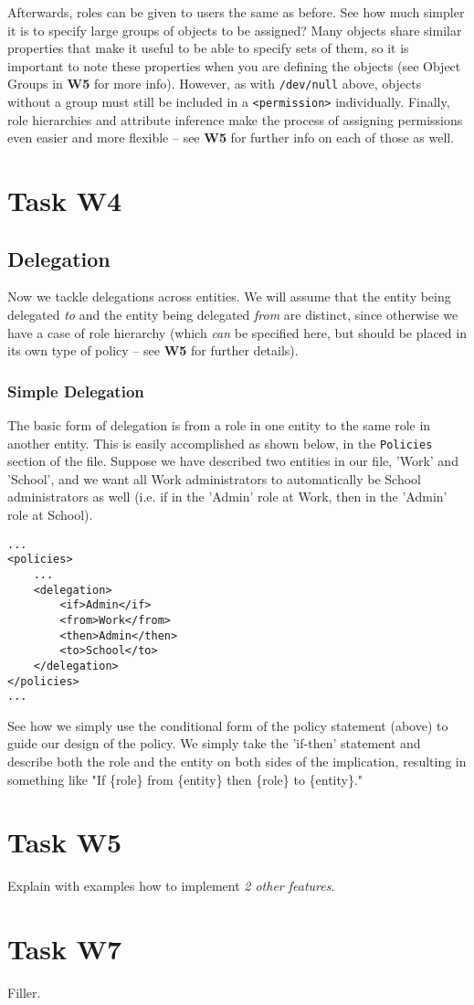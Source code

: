 \documentclass{article}
\providecommand{\task}[1]{\section{Task #1}}
\providecommand{\inlinecode}{\texttt}
\begin{document}
Afterwards, roles can be given to users the same as before. See how much simpler it is to specify large groups of objects to be assigned? Many objects share similar properties that make it useful to be able to specify sets of them, so it is important to note these properties when you are defining the objects (see Object Groups in \textbf{W5} for more info). However, as with \inlinecode{/dev/null} above, objects without a group must still be included in a \inlinecode{<permission>} individually. Finally, role hierarchies and attribute inference make the process of assigning permissions even easier and more flexible -- see \textbf{W5} for further info on each of those as well.

\bigskip

\task{W4}
\subsection{Delegation}
Now we tackle delegations across entities. We will assume that the entity being delegated \textit{to} and the entity being delegated \textit{from} are distinct, since otherwise we have a case of role hierarchy (which \textit{can} be specified here, but should be placed in its own type of policy -- see \textbf{W5} for further details).

\subsubsection{Simple Delegation}
The basic form of delegation is from a role in one entity to the same role in another entity. This is easily accomplished as shown below, in the \inlinecode{Policies} section of the file. Suppose we have described two entities in our file, 'Work' and 'School', and we want all Work administrators to automatically be School administrators as well (i.e. if in the 'Admin' role at Work, then in the 'Admin' role at School).
\pagebreak

\begin{lstlisting}
...
<policies>
    ...
    <delegation>
        <if>Admin</if>
        <from>Work</from>
        <then>Admin</then>
        <to>School</to>
    </delegation>
</policies>
...
\end{lstlisting}
See how we simply use the conditional form of the policy statement (above) to guide our design of the policy. We simply take the 'if-then' statement and describe both the role and the entity on both sides of the implication, resulting in something like "{If} \{role\} {from} \{entity\} {then} \{role\} {to} \{entity\}."



\task{W5}
Explain with examples how to implement \textit{2 other features}.


\section{Task W7}
Filler.

\pagebreak

\printbibliography[heading=bibintoc]
\end{document}

